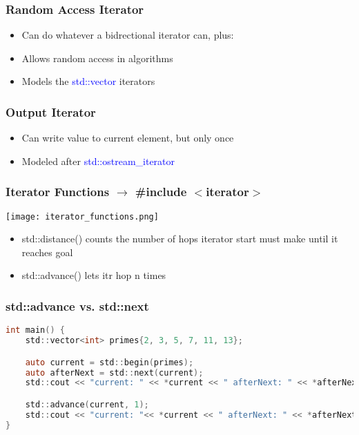 \subsubsection{Random Access Iterator}
\begin{itemize}
    \item Can do whatever a bidrectional iterator can, plus:
    \item Allows random access in algorithms
    \item Models the \textcolor{blue}{std::vector} iterators
\end{itemize}
\subsubsection{Output Iterator}
\begin{itemize}
    \item Can write value to current element, but only once
    \item Modeled after \textcolor{blue}{std::ostream\_iterator}
\end{itemize}
\subsubsection{Iterator Functions $\rightarrow$ \#include $<$iterator$>$}
\texttt{[image: iterator\_functions.png]}
\begin{itemize}
    \item std::distance() counts the number of hops iterator start must make until it reaches goal
    \item std::advance() lets itr hop n times
\end{itemize}
\subsubsection{std::advance vs. std::next}
\begin{lstlisting}[style=frame, style= linenumbers, language=C]
int main() {
    std::vector<int> primes{2, 3, 5, 7, 11, 13};

    auto current = std::begin(primes);
    auto afterNext = std::next(current);
    std::cout << "current: " << *current << " afterNext: " << *afterNext << '\n';

    std::advance(current, 1);
    std::cout << "current: "<< *current << " afterNext: " << *afterNext << '\n';
}
\end{lstlisting}